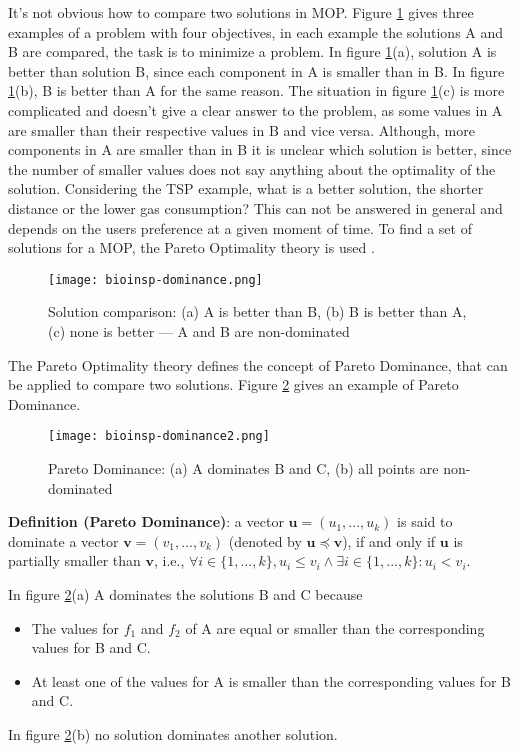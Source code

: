 It's not obvious how to compare two solutions in MOP. Figure \ref{fig:dominance} gives three examples of a problem with four objectives, in each example the solutions A and B are compared, the task is to minimize a problem. In figure \ref{fig:dominance}(a), solution A is better than solution B, since each component in A is smaller than in B. In figure \ref{fig:dominance}(b), B is better than A for the same reason. The situation in figure \ref{fig:dominance}(c) is more complicated and doesn't give a clear answer to the problem, as some values in A are smaller than their respective values in B and vice versa. Although, more components in A are smaller than in B it is unclear which solution is better, since the number of smaller values does not say anything about the optimality of the solution. Considering the TSP example, what is a better solution, the shorter distance or the lower gas consumption? This can not be answered in general and depends on the users preference at a given moment of time. To find a set of solutions for a MOP, the Pareto Optimality theory is used \cite{ehrgott2005multicriteria}.

\begin{figure}
  \centering
  \texttt{[image: bioinsp-dominance.png]}
  \caption[Solution comparison]{Solution comparison: (a) A is better than B, (b) B is better than A, (c) none is better --- A and B are non-dominated}
  \label{fig:dominance}
\end{figure}

The Pareto Optimality theory defines the concept of Pareto Dominance, that can be applied to compare two solutions. Figure \ref{fig:dominance2} gives an example of Pareto Dominance.

\begin{figure}
  \centering
  \texttt{[image: bioinsp-dominance2.png]}
  \caption[Pareto Dominance]{Pareto Dominance: (a) A dominates B and C, (b) all points are non-dominated}
  \label{fig:dominance2}
\end{figure}

\noindent\textbf{Definition (Pareto Dominance)}: a vector $\mathbf{u} = (u_1,...,u_k)$ is said to dominate a vector $\mathbf{v} = (v_1,...,v_k)$ (denoted by $\mathbf{u} \preceq \mathbf{v}$), if and only if $\mathbf{u}$ is partially smaller than $\mathbf{v}$, i.e., $\forall i \in \{1,...,k\}, u_i \leq v_i \land \exists i \in \{1,...,k\}: u_i < v_i$.

In figure \ref{fig:dominance2}(a) A dominates the solutions B and C because
\begin{itemize}
  \item The values for $f_1$ and $f_2$ of A are equal or smaller than the corresponding values for B and C.
  \item At least one of the values for A is smaller than the corresponding values for B and C.
\end{itemize}
In figure \ref{fig:dominance2}(b) no solution dominates another solution.

